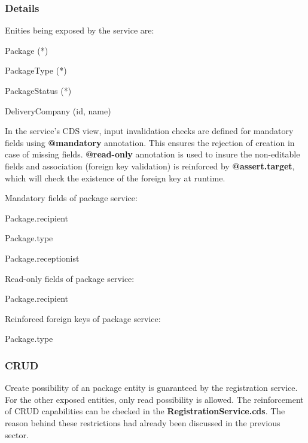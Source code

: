 \subsubsection{Details}

Enities being exposed by the service are:
\begin{compactenum}
	\item Package (*)
    \item PackageType (*)
    \item PackageStatus (*)
    \item DeliveryCompany (id, name)
\end{compactenum}

\bigskip
In the service's CDS view, input invalidation checks are defined for mandatory fields using \textbf{@mandatory} annotation. This ensures the rejection of creation in case of missing fields. \textbf{@read-only} annotation is used to insure the non-editable fields and association (foreign key validation) is reinforced by \textbf{@assert.target}, which will check the existence of the foreign key at runtime.

\bigskip
Mandatory fields of package service:
\begin{compactenum}
	\item Package.recipient
    \item Package.type
    \item Package.receptionist
\end{compactenum}

\bigskip
Read-only fields of package service:
\begin{compactenum}
	\item Package.recipient
\end{compactenum}

\bigskip
Reinforced foreign keys of package service:
\begin{compactenum}
	\item Package.type
\end{compactenum}


\subsubsection{CRUD}
Create possibility of an package entity is guaranteed by the registration service. For the other exposed entities, only read possibility is allowed. The reinforcement of CRUD capabilities can be checked in the \textbf{RegistrationService.cds}. The reason behind these restrictions had already been discussed in the previous sector.

